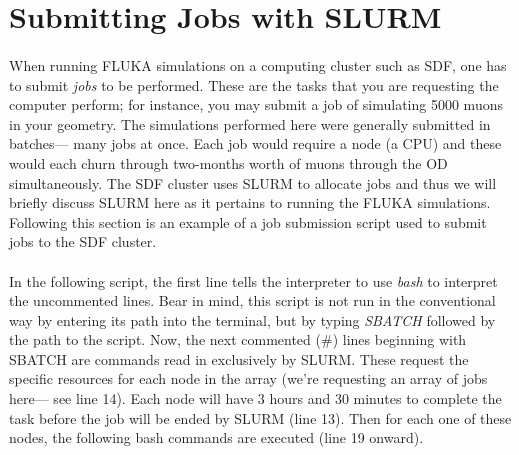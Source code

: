 \section{Submitting Jobs with SLURM}


\paragraph{}
When running FLUKA simulations on a computing cluster such as SDF, one has to submit \textit{jobs} to be performed. These are the tasks that you are requesting the computer perform; for instance, you may submit a job of simulating 5000 muons in your geometry. The simulations performed here were generally submitted in batches— many jobs at once. Each job would require a node (a CPU) and these would each churn through two-months worth of muons through the OD simultaneously.  The SDF cluster uses SLURM to allocate jobs and thus we will briefly discuss SLURM here as it pertains to running the FLUKA simulations. Following this section is an example of a job submission script used to submit jobs to the SDF cluster.

\paragraph{}
In the following script, the first line tells the interpreter to use \textit{bash} to interpret the uncommented lines. Bear in mind, this script is not run in the conventional way by entering its path into the terminal, but by typing \textit{SBATCH} followed by the path to the script. Now, the next commented (\#) lines beginning with SBATCH are commands read in exclusively by SLURM. These request the specific resources for each node in the array (we're requesting an array of jobs here— see line 14). Each node will have 3 hours and 30 minutes to complete the task before the job will be ended by SLURM (line 13). Then for each one of these nodes, the following bash commands are executed (line 19 onward).


